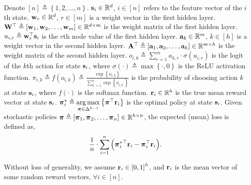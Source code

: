Denote $[n] \triangleq \left\{ 1,2, \dots, n \right\}$. ${\mathbf{s}}_i \in {\mathbb{R}}^d$, $i \in [n]$ refers to the feature vector of the $i$th state. ${\mathbf{w}}_r \in {\mathbb{R}}^d$, $r \in [m]$ is a weight vector in the first hidden layer. ${\mathbf{W}}^\top \triangleq \left[ {\mathbf{w}}_1, {\mathbf{w}}_2, \dots, {\mathbf{w}}_m \right] \in {\mathbb{R}}^{d \times m}$ is the weight matrix of the first hidden layer. $u_{i,r} \triangleq {\mathbf{w}}_r^\top {\mathbf{s}}_i$ is the $r$th node value of the first hidden layer. ${\mathbf{a}}_k \in {\mathbb{R}}^m$, $k \in [h]$ is a weight vector in the second hidden layer. ${\mathbf{A}}^\top \triangleq \left[ {\mathbf{a}}_1, {\mathbf{a}}_2, \dots, {\mathbf{a}}_h \right] \in {\mathbb{R}}^{m \times h}$ is the weight matrix of the second hidden layer. $o_{i,k} \triangleq \sum\limits_{r=1}^{m}{a_{k,r} \cdot \sigma\left( u_{i,r} \right)}$ is the logit of the $k$th action for state ${\mathbf{s}}_i$, where $\sigma(\cdot) \triangleq \max\left\{ \cdot, 0 \right\}$ is the ReLU activation function. $\pi_{i,k} \triangleq f\left( o_{i,k} \right) \triangleq \frac{\exp\left\{ o_{i,k} \right\}}{\sum\limits_{k^\prime = 1}^{h}{\exp\left\{ o_{i,k^\prime} \right\}}}$ is the probability of choosing action $k$ at state ${\mathbf{s}}_i$, where $f(\cdot)$ is the softmax function. ${\mathbf{r}}_i \in {\mathbb{R}}^h$ is the true mean reward vector at state ${\mathbf{s}}_i$. ${\boldsymbol{\pi}}_i^* \triangleq \operatorname*{arg\,max}\limits_{{\boldsymbol{\pi}} \in \Delta^{h-1}}{\left\{ {\boldsymbol{\pi}}^\top {\mathbf{r}}_i \right\}}$ is the optimal policy at state ${\mathbf{s}}_i$. Given stochastic policies ${\boldsymbol{\pi}} \triangleq \left[ {\boldsymbol{\pi}}_1, {\boldsymbol{\pi}}_2, \dots, {\boldsymbol{\pi}}_n \right] \in {\mathbb{R}}^{h \times n}$, the expected (mean) loss is defined as,
\begin{equation}
\label{eq:expected_loss}
\begin{split}
\frac{1}{n} \cdot \sum\limits_{i=1}^{n}{ \left( {{\boldsymbol{\pi}}_i^*}^\top {\mathbf{r}}_i - {\boldsymbol{\pi}}_i^\top {\mathbf{r}}_i \right) }.
\end{split}
\end{equation}

Without loss of generality, we assume ${\mathbf{r}}_i \in \left[ 0, 1 \right]^h$, and ${\mathbf{r}}_i$ is the mean vector of some random reward vectors,  $\forall i \in [n]$.